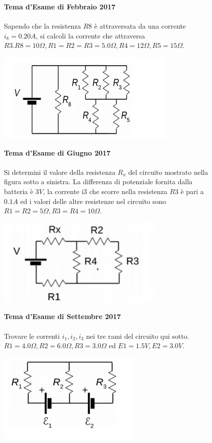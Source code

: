 \begin{figure}[h!]
\textbf{Tema d'Esame di Febbraio 2017}\\ \\
Sapendo che la resistenza $R8$ è attraversata da una corrente $i_8 = 0.20 A$, si calcoli la corrente che attraversa $R3. R8 = 10 \Omega, R1 = R2 = R3 = 5.0 \Omega , R4 = 12 \Omega , R5 = 15 \Omega $.
\begin{center}
		\includegraphics[scale=1.1]{ES5/FEB052017.jpg}
	\end{center}
\end{figure}

\begin{figure}[h!]
\textbf{Tema d'Esame di Giugno 2017}\\ \\
 Si determini il valore della resistenza $R_x$ del circuito mostrato nella figura sotto a sinistra. La differenza di potenziale fornita dalla batteria è $3 V$, la corrente i3 che scorre nella resistenza $R3$ è pari a $0.1 A$ ed i valori delle altre resistenze nel circuito
sono $R1 = R2 = 5 \Omega ,R3 = R4 = 10 \Omega$.
\begin{center}
		\includegraphics[scale=1.1]{ES5/GIU052017.jpg}
	\end{center}
\end{figure}

\begin{figure}[h!]
\textbf{Tema d'Esame di Settembre 2017}\\ \\
Trovare le correnti $i_1, i_2 , i_3$ nei tre rami del circuito qui sotto.
$R1 = 4.0 \Omega, R2 = 6.0 \Omega, R3 = 3.0 \Omega$ ed $ E 1 = 1.5 V,  E 2 = 3.0 V$.
\begin{center}
		\includegraphics[scale=1.1]{ES5/SET052017.jpg}
	\end{center}
\end{figure}